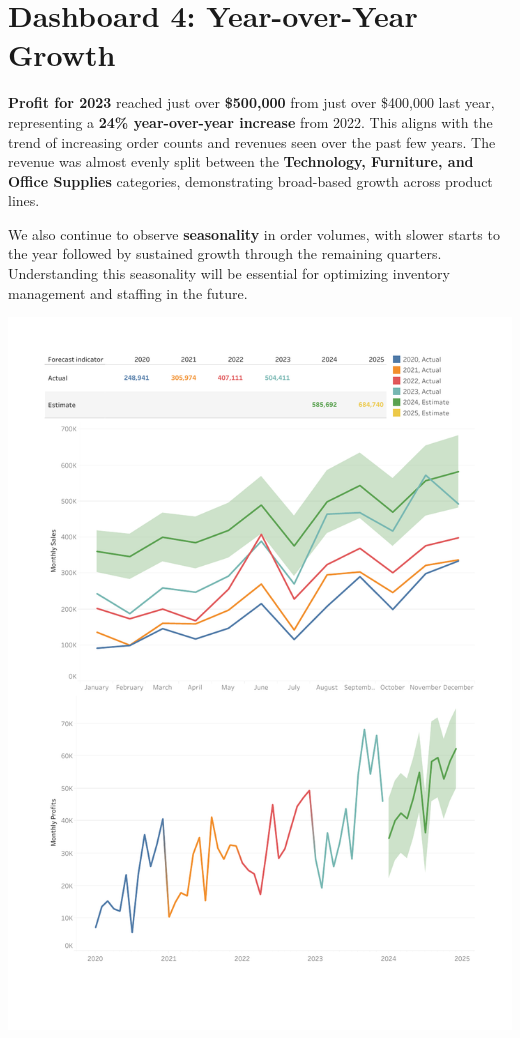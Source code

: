 \documentclass[12pt,a4paper]{article}
\begin{document}
\restoregeometry

\newpage

\section{Dashboard 4: Year-over-Year Growth}

\textbf{Profit for 2023} reached just over \textbf{\$500,000} from just over \$400,000 last year, representing a \textbf{24\% year-over-year increase} from 2022. This aligns with the trend of increasing order counts and revenues seen over the past few years. The revenue was almost evenly split between the \textbf{Technology, Furniture, and Office Supplies} categories, demonstrating broad-based growth across product lines. 

We also continue to observe \textbf{seasonality} in order volumes, with slower starts to the year followed by sustained growth through the remaining quarters. Understanding this seasonality will be essential for optimizing inventory management and staffing in the future.

\vspace*{-0.5cm} %

\noindent
\includegraphics[width=\paperwidth,height=\paperheight,keepaspectratio]{Dashboard6.pdf}
\end{document}
